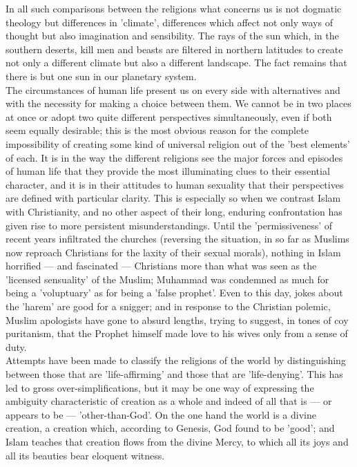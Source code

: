 \documentclass[10pt, twoside]{book}
\begin{document}
In all such comparisons between the religions what concerns us is not dogmatic theology but 
differences in 'climate', differences which affect not only ways of thought but also imagination and 
sensibility. The rays of the sun which, in the southern deserts, kill men and beasts are filtered in 
northern latitudes to create not only a different climate but also a different landscape. The fact 
remains that there is but one sun in our planetary system. \\

The circumstances of human life present us on every side with alternatives and with the necessity for 
making a choice between them. We cannot be in two places at once or adopt two quite different 
perspectives simultaneously, even if both seem equally desirable; this is the most obvious reason for 
the complete impossibility of creating some kind of universal religion out of the 'best elements' of 
each. It is in the way the different religions see the major forces and episodes of human life that 
they provide the most illuminating clues to their essential character, and it is in their attitudes 
to human sexuality that their perspectives are defined with particular clarity. This is especially so 
when we contrast Islam with Christianity, and no other aspect of their long, enduring confrontation 
has given rise to more persistent misunderstandings. Until the 'permissiveness' of recent years 
infiltrated the churches (reversing the situation, in so far as Muslims now reproach Christians for 
the laxity of their sexual morals), nothing in Islam horrified --- and fascinated --- Christians more 
than what was seen as the 'licensed sensuality' of the Muslim; Muhammad was condemned as much for 
being a 'voluptuary' as for being a 'false prophet'. Even to this day, jokes about the 'harem' are 
good for a snigger; and in response to the Christian polemic, Muslim apologists have gone to absurd 
lengths, trying to suggest, in tones of coy puritanism, that the Prophet himself made love to his 
wives only from a sense of duty. \\

Attempts have been made to classify the religions of the world by distinguishing between those that 
are 'life\hyp{}affirming' and those that are 'life\hyp{}denying'. This has led to gross over\hyp{}simplifications, 
but it may be one way of expressing the ambiguity characteristic of creation as a whole and indeed of 
all that is --- or appears to be --- 'other\hyp{}than\hyp{}God'. On the one hand the world is a divine creation, a 
creation which, according to Genesis, God found to be 'good'; and Islam teaches that creation flows 
from the divine Mercy, to which all its joys and all its beauties bear eloquent witness. \\
\end{document}
